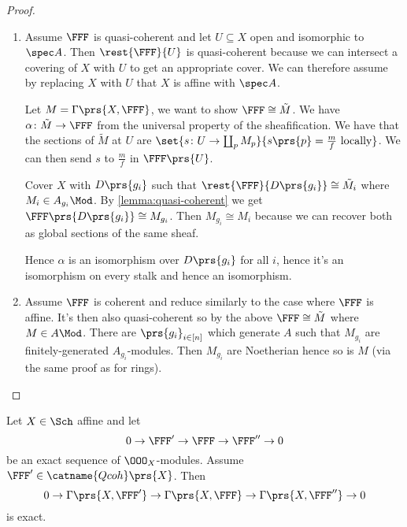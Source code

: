 \documentclass[10pt,a4paper,twoside,openany,hidelinks]{book}
\begin{document}
\begin{proof}
\begin{enumerate}
\item Assume $\FFF$ is quasi-coherent and let $U \subseteq X$ open and isomorphic to $\spec A$. Then $\rest{\FFF}{U}$ is quasi-coherent because we can intersect a covering of $X$ with $U$ to get an appropriate cover. We can therefore assume by replacing $X$ with $U$ that $X$ is affine with $\spec A$.

Let $M = \Gamma\prs{X, \FFF}$, we want to show $\FFF \cong \tilde{M}$.
We have $\alpha \colon \tilde{M} \to \FFF$ from the universal property of the sheafification.
We have that the sections of $\tilde{M}$ at $U$ are $\set{s \colon U \to \coprod_p M_p}{s\prs{p} = \frac{m}{f} \text{ locally}}$.
We can then send $s$ to $\frac{m}{f}$ in $\FFF\prs{U}$.

Cover $X$ with $D\prs{g_i}$ such that $\rest{\FFF}{D\prs{g_i}} \cong \tilde{M_i}$ where $M_i \in A_{g_i}\Mod$.
By \ref{lemma:quasi-coherent} we get $\FFF\prs{D\prs{g_i}} \cong M_{g_i}$. Then $M_{g_i} \cong M_i$ because we can recover both as global sections of the same sheaf.

Hence $\alpha$ is an isomorphism over $D\prs{g_i}$ for all $i$, hence it's an isomorphism on every stalk and hence an isomorphism.

\item Assume $\FFF$ is coherent and reduce similarly to the case where $\FFF$ is affine. It's then also quasi-coherent so by the above $\FFF \cong \tilde{M}$ where $M \in A\Mod$. There are $\prs{g_i}_{i \in [n]}$ which generate $A$ such that $M_{g_i}$ are finitely-generated $A_{g_i}$-modules.
Then $M_{g_i}$ are Noetherian hence so is $M$ (via the same proof as for rings).
\end{enumerate}
\end{proof}

\begin{proposition}
Let $X \in \Sch$ affine and let
\[0 \to \FFF' \to \FFF \to \FFF'' \to 0\]
be an exact sequence of $\OOO_X$-modules. Assume $\FFF' \in \catname{Qcoh}\prs{X}$. Then
\[0 \to \Gamma\prs{X,\FFF'} \to \Gamma\prs{X,\FFF} \to \Gamma\prs{X,\FFF''} \to 0\]
is exact.
\end{proposition}
\end{document}
